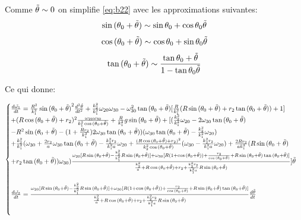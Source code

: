 Comme $\Tilde{\theta} \sim 0$ on simplifie \ref{eq:b22} avec les approximations suivantes:
$$
\sin{(\theta_0+\Tilde{\theta})} \sim \sin{\theta_0}+\cos{\theta_0}\Tilde{\theta} 
$$
$$
\cos{(\theta_0+\Tilde{\theta})} \sim \cos{\theta_0}+\sin{\theta_0}\Tilde{\theta} \\
$$
$$
\tan{(\theta_0+\Tilde{\theta})} \sim \frac{\tan{\theta_0}+\Tilde{\theta}}{1-\tan{\theta_0}\Tilde{\theta}}
$$

Ce qui donne:

\begin{equation}
  \begin{cases}
    \frac{d\Tilde{\omega_1}}{dt}=\frac{R^2}{k_1^2}\sin{(\theta_0+\Tilde{\theta})}^2\frac{d^2\Tilde{\theta}}{dt^2}+\frac{k_2^2}{k_1^2}\omega_{20}\omega_{30}-\omega_{30}^2\tan{(\theta_0+\Tilde{\theta})}[\frac{R}{k_1^2}(R\sin{(\theta_0+\Tilde{\theta})}+r_2\tan{(\theta_0+\Tilde{\theta})})+1]\\
    +(R\cos{(\theta_0+\Tilde{\theta})}+r_2)^2\frac{\omega_{20}\omega_{30}}{k_1^2 \cos{(\theta_0+\Tilde{\theta})}}+\frac{R}{k_1^2}g \sin{(\theta_0+\Tilde{\theta})}+[(\frac{k_2^2}{k_1^2}\omega_{20}-2\omega_{30}\tan{(\theta_0+\Tilde{\theta})}\\
    -R^2\sin{(\theta_0+\Tilde{\theta})}-(1+\frac{R r_2}{k_1^2})2\omega_{30}\tan{(\theta_0+\Tilde{\theta})})(\omega_{30}\tan{(\theta_0+\Tilde{\theta})}-\frac{k_2^2}{k_1^2}\omega_{20})\\
    +\frac{k_2^2}{k_1^2}(\omega_{30}+\frac{2r_2}{a}\omega_{30} \tan{(\theta_0+\Tilde{\theta})}-\frac{k_2^2 r_2}{k_1^2 a}\omega_{20}+\frac{(R\cos{(\theta_0+\Tilde{\theta})}+r_2)^2}{k_2^2\cos{(\theta_0+\Tilde{\theta})}}(\omega_{30}-\frac{k_2^2 r_2}{k_1^2 a}\omega_{20})+\frac{2R r_2}{a k_1^2}(R\sin{(\theta_0+\Tilde{\theta})}\\
    +r_2 \tan{(\theta_0+\Tilde{\theta})})\omega_{30})\frac{\omega_{20}[R\sin{(\theta_0+\Tilde{\theta})}-\frac{k_2^2}{k_1^2}R\sin{(\theta_0+\Tilde{\theta})}]+\omega_{30}[R(1+\cos{(\theta_0+\Tilde{\theta})})+\frac{r_2}{\cos{(\theta_0+\Tilde{\theta})}}+R\sin{(\theta_0+\Tilde{\theta})}\tan{(\theta_0+\Tilde{\theta})}]}{\frac{k_2^2}{a}+R\cos{(\theta_0+\Tilde{\theta})}+r_2+\frac{k_2^2 r_2}{k_1^2 a}R\sin{(\theta_0+\Tilde{\theta})}}]\Tilde{\theta} \\
    \\
    
    \frac{d\Tilde{\omega_2}}{dt}=\frac{\omega_{20}[R\sin{(\theta_0+\Tilde{\theta})}-\frac{k_2^2}{k_1^2}R\sin{(\theta_0+\Tilde{\theta})}]+\omega_{30}[R(1+\cos{(\theta_0+\Tilde{\theta})})+\frac{r_2}{\cos{(\theta_0+\Tilde{\theta})}}+R\sin{(\theta_0+\Tilde{\theta})}\tan{(\theta_0+\Tilde{\theta})}]}{\frac{k_2^2}{a}+R\cos{(\theta_0+\Tilde{\theta})}+r_2+\frac{k_2^2 r_2}{k_1^2 a}R\sin{(\theta_0+\Tilde{\theta})}} \frac{d\Tilde{\theta}}{dt}\\
    \\
    

\end{cases}
\end{equation}
